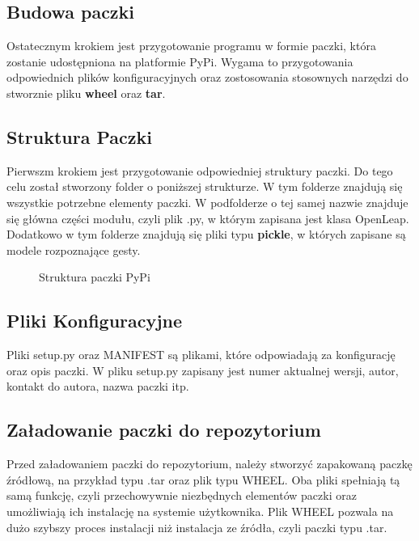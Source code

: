     \subsection{Budowa paczki}
    
    \quad Ostatecznym krokiem jest przygotowanie programu w formie paczki, która zostanie udostępniona na platformie PyPi. Wygama to przygotowania odpowiednich plików konfiguracyjnych oraz zostosowania stosownych narzędzi do stworznie pliku \textbf{wheel} oraz \textbf{tar}. 
    
    \subsection{Struktura Paczki}
    \quad Pierwszm krokiem jest przygotowanie odpowiedniej struktury paczki. Do tego celu został stworzony folder o poniższej strukturze. W tym folderze znajdują się wszystkie potrzebne elementy paczki. W podfolderze o tej samej nazwie znajduje się główna części modułu, czyli plik .py, w którym zapisana jest klasa OpenLeap. Dodatkowo w tym folderze znajdują się pliki typu \textbf{pickle}, w których zapisane są modele rozpoznające gesty.
    
    \begin{figure}
    \centering
        \begin{minipage}{7cm}
        \end{minipage}
        \caption{Struktura paczki PyPi}
    \end{figure}
    
    \subsection{Pliki Konfiguracyjne}
    \quad Pliki setup.py oraz MANIFEST są plikami, które odpowiadają za konfigurację oraz opis paczki. W pliku setup.py zapisany jest numer aktualnej wersji, autor, kontakt do autora, nazwa paczki itp. 
    
    \quad 
    
    
    \subsection{Załadowanie paczki do repozytorium}
    
    \quad Przed załadowaniem paczki do repozytorium, należy stworzyć zapakowaną paczkę źródłową, na przykład typu .tar oraz plik typu WHEEL. Oba pliki spełniają tą samą funkcję, czyli przechowywnie niezbędnych elementów paczki oraz umożliwiają ich instalację na systemie użytkownika. Plik WHEEL pozwala na dużo szybszy proces instalacji niż instalacja ze źródła, czyli paczki typu .tar. 
